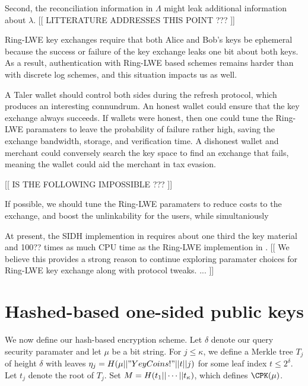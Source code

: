 \documentclass{llncs}
\begin{document}
Second, the reconciliation information in $\Lambda$ might leak
additional information about $\lambda$.  
[[ LITTERATURE ADDRESSES THIS POINT ??? ]]

Ring-LWE key exchanges require that both Alice and Bob's keys be
ephemeral because the success or failure of the key exchange
leaks one bit about both keys\cite{}.  As a result, authentication
with Ring-LWE based schemes remains harder than with discrete log
schemes\cite{??RLWEsig??}, and this situation impacts us as well.

A Taler wallet should control both sides during the refresh protocol,
 which produces an interesting connundrum.
An honest wallet could ensure that the key exchange always succeeds.
If wallets were honest, then one could tune the Ring-LWE paramaters
to leave the probability of failure rather high,
 saving the exchange bandwidth, storage, and verification time.
A dishonest wallet and merchant could conversely search the key space
to find an exchange that fails, meaning the wallet could aid the
merchant in tax evasion. 

[[ IS THE FOLLOWING IMPOSSIBLE ??? ]]

If possible, we should  tune the Ring-LWE paramaters to reduce costs
to the exchange, and boost the unlinkability for the users, while 
simultaniously


At present, the SIDH implemention in \cite{SIDH16} requires about
one third the key material and 100?? times as much CPU time as the
Ring-LWE implemention in \cite{NewHope}.
[[ We believe this provides a strong reason to continue exploring 
paramater choices for Ring-LWE key exchange along with protocol tweaks.  
... ]]


\section{Hashed-based one-sided public keys}

We now define our hash-based encryption scheme.
Let $\delta$ denote our query security paramater and
 let $\mu$ be a bit string.
For $j \le \kappa$, we define a Merkle tree $T_j$ of height $\delta$
with leaves $\eta_j = H(\mu || "YeyCoins!" || t || j)$
 for some leaf index $t \le 2^\delta$. 
Let $t_j$ denote the root of $T_j$.
Set $M = H(t_1 || \cdots || t_\kappa)$,
 which defines $\CPK(\mu)$.
\end{document}
